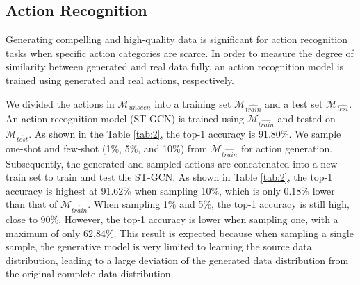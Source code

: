 \begin{table}
  \centering
  \caption{Quantitative evaluation. We calculated FMD and Acc using $\mathcal{M}_{full}$, $\mathcal{M}_{seen}$, and $\mathcal{M}_{unseen}$. $\mathcal{M}_{full}$ contains six categories of action: “Brush Hair”, “Writing”, “Put on a Shoe”, “Take off Glasses”, “Hopping”, and “Shake Head”. For representation simplicity, we numbered the six categories of target action as A0, A1, A2, A3, A4, and A5.}
  \label{tab:1}
\end{table}

\subsection{Action Recognition}
\label{sec:motion recognition}

Generating compelling and high-quality data is significant for action recognition tasks when specific action categories are scarce. 
In order to measure the degree of similarity between generated and real data fully, an action recognition model is trained using generated and real actions, respectively. 

We divided the actions in $\mathcal{M}_{unseen}$ into a training set $\mathcal{M}_{\hat{train}}$ and a test set $\mathcal{M}_{\hat{test}}$. An action recognition model (ST-GCN) is trained using $\mathcal{M}_{\hat{train}}$ and tested on $\mathcal{M}_{\hat{test}}$. As shown in the Table \ref{tab:2}, the top-1 accuracy is 91.80\%.  
We sample one-shot and few-shot (1\%, 5\%, and 10\%) from $\mathcal{M}_{\hat{train}}$ for action generation. 
Subsequently, the generated and sampled actions are concatenated into a new train set to train and test the ST-GCN. 
As shown in Table \ref{tab:2}, the top-1 accuracy is highest at 91.62\% when sampling 10\%, which is only 0.18\% lower than that of $\mathcal{M}_{\hat{train}}$. When sampling 1\% and 5\%, the top-1 accuracy is still high, close to 90\%. 
However, the top-1 accuracy is lower when sampling one, with a maximum of only 62.84\%. 
This result is expected because when sampling a single sample, the generative model is very limited to learning the source data distribution, leading to a large deviation of the generated data distribution from the original complete data distribution. 

